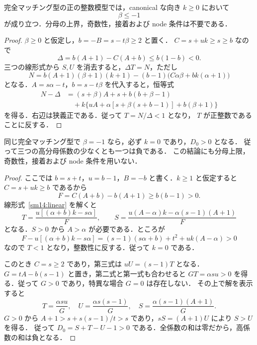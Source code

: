 \begin{theorem}
\label{sm14:beta-negative}
完全マッチング型の正の整数模型では，canonical な向き $k\geq0$ において
\[
 \beta\leq-1
\]
が成り立つ．分母の上界，奇数性，接着および node 条件は不要である．
\end{theorem}

\begin{proof}
$\beta\geq0$ と仮定し，$b=-B=s-t\beta\geq2$ と置く．
$C=s+uk\geq s\geq b$ なので
\[
 \Delta=b(A+1)-C(A+b)\leq b(1-b)<0.
\]
三つの線形式から $S,U$ を消去すると，$\Delta T=N$，ただし
\[
 N=b(A+1)(\beta+1)(k+1)
   -(b-1)\bigl(C\alpha\beta+bk(\alpha+1)\bigr)
\]
となる．$A=s\alpha-t$，$b=s-t\beta$ を代入すると，恒等式
\begin{align*}
 N-\Delta
  &=(s+\beta)A+s+b(b+\beta-1)\\
  &\quad+k\bigl\{uA+\alpha[s+\beta(s+b-1)]+b(\beta+1)\bigr\}
\end{align*}
を得る．右辺は狭義正である．従って $T=N/\Delta<1$ となり，
$T$ が正整数であることに反する．
\end{proof}

\begin{theorem}[$\beta=-1$ の境界と高係数の負性]
\label{sm14:beta-boundary}
同じ完全マッチング型で $\beta=-1$ なら，必ず $k=0$ であり，$D_0>0$ となる．
従って三つの高分母係数の少なくとも一つは負である．
この結論にも分母上限，奇数性，接着および node 条件を用いない．
\end{theorem}

\begin{proof}
ここでは $b=s+t$，$u=b-1$，$B=-b$ と書く．$k\geq1$ と仮定すると
$C=s+uk\geq b$ であるから
\[
 F=C(A+b)-b(A+1)\geq b(b-1)>0.
\]
線形式~\eqref{sm14:linear} を解くと
\[
 T=\frac{u[(\alpha+b)k-s\alpha]}{F},\qquad
 S=\frac{u(A-\alpha)k-\alpha(s-1)(A+1)}{F}
\]
となる．$S>0$ から $A>\alpha$ が必要である．ところが
\[
 F-u[(\alpha+b)k-s\alpha]
 =(s-1)(s\alpha+b)+t^2+uk(A-\alpha)>0
\]
なので $T<1$ となり，整数性に反する．従って $k=0$ である．

このとき $C=s\geq2$ であり，第三式は $uU=(s-1)T$ となる．
$G=tA-b(s-1)$ と置き，第二式と第一式も合わせると
$GT=\alpha su>0$ を得る．従って $G>0$ であり，特異な場合 $G=0$ は存在しない．
その上で解を表示すると
\[
 T=\frac{\alpha su}{G},\quad
 U=\frac{\alpha s(s-1)}{G},\quad
 S=\frac{\alpha(s-1)(A+1)}{G}.
\]
$G>0$ から
$A+1>s+s(s-1)/t>s$ であり，$sS=(A+1)U$ により $S>U$ を得る．
従って $D_0=S+T-U-1>0$ である．全係数の和は零だから，高係数の和は負となる．
\end{proof}

